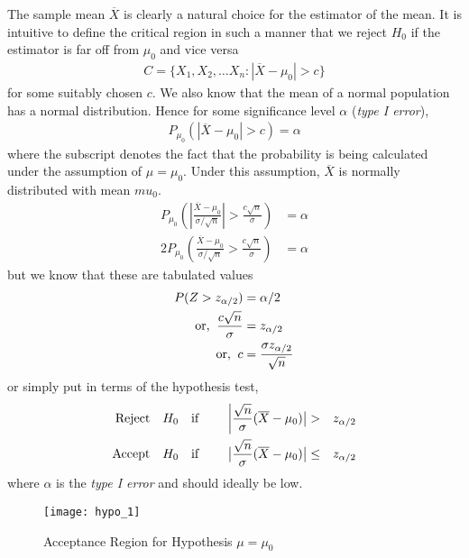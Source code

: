 \documentclass[../probability-notes.tex]{subfiles}
\begin{document}
    The sample mean $\overline{X}$ is clearly a natural choice for the estimator of the mean. It is intuitive to define the critical region in such a manner that we reject $H_{0}$ if the estimator is far off from $\mu_{0}$ and vice versa
    \begin{align*}
        C = \{ X_{1}, X_{2}, \ldots X_{n}: |\overline{X} - \mu_{0}| > c\}
    \end{align*}
    for some suitably chosen $c$. We also know that the mean of a normal population has a normal distribution. Hence for some significance level $\alpha$ (\emph{type I error}),
    \begin{align*}
        P_{\mu_{0}}(|\overline{X} - \mu_{0}| > c) = \alpha
    \end{align*}
    where the subscript denotes the fact that the probability is being calculated under the assumption of $\mu = \mu_{0}$. Under this assumption, $\overline{X}$ is normally distributed with mean $mu_{0}$.
    \begin{align*}
        P_{\mu_{0}}(|\frac{\overline{X} - \mu_{0}}{\sigma/\sqrt{n}}| > \frac{c\sqrt{n}}{\sigma}) &= \alpha\\
        2P_{\mu_{0}}(\frac{\overline{X} - \mu_{0}}{\sigma/\sqrt{n}} > \frac{c\sqrt{n}}{\sigma}) &= \alpha
    \end{align*}
    but we know that these are tabulated values
    \begin{align*}
        P(Z > z_{\alpha/2}) &= \alpha/2\\
        \text{or, \:} \frac{c\sqrt{n}}{\sigma} &= z_{\alpha/2}\\
        \text{or, \:} c &= \frac{\sigma z_{\alpha/2}}{\sqrt{n}}
    \end{align*}
    or simply put in terms of the hypothesis test,
    \begin{alignat*}{4}
        \text{Reject\quad} &H_{0} \text{\quad if \quad} &\bigg\lvert \frac{\sqrt{n}}{\sigma}(\overline{X} - \mu_{0}) \big\rvert &> &z_{\alpha/2}\\
        \text{Accept\quad} &H_{0} \text{\quad if\quad} &\big\lvert \frac{\sqrt{n}}{\sigma}(\overline{X} - \mu_{0}) \big\rvert &\leq &z_{\alpha/2}\\
    \end{alignat*}
    where $\alpha$ is the \emph{type I error} and should ideally be low.

    \begin{figure}[h]
    \texttt{[image: hypo\_1]}
    \centering
    \caption{Acceptance Region for Hypothesis $\mu=\mu_{0}$}
    \label{fig:hypo_1} %
    \end{figure}
\end{document}
